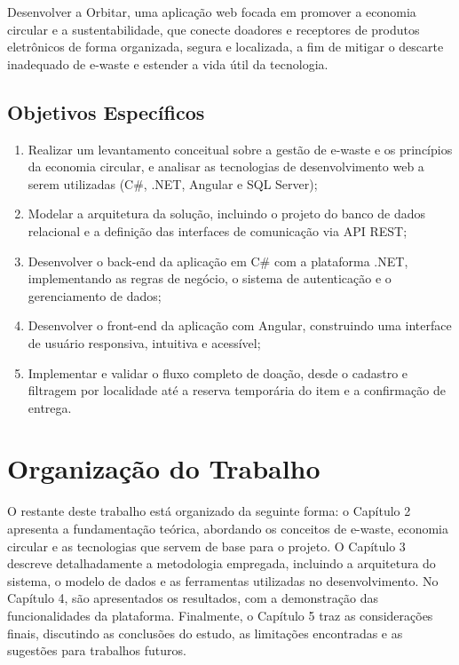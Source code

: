 \documentclass[
	12pt,				%
	openright,			%
	oneside,			%
	a4paper,			%
	english,			%
	brazil				%
	]{abntex2}
\theoremstyle{definition}
\begin{document}
Desenvolver a Orbitar, uma aplicação web focada em promover a economia circular e a sustentabilidade, que conecte doadores e receptores de produtos eletrônicos de forma organizada, segura e localizada, a fim de mitigar o descarte inadequado de e-waste e estender a vida útil da tecnologia.

\subsection[Objetivos Específicos]{Objetivos Específicos}

\begin{enumerate}[label={\alph*}]
    \item Realizar um levantamento conceitual sobre a gestão de e-waste e os princípios da economia circular, e analisar as tecnologias de desenvolvimento web a serem utilizadas (C\#, .NET, Angular e SQL Server);
    \item Modelar a arquitetura da solução, incluindo o projeto do banco de dados relacional e a definição das interfaces de comunicação via API REST;
    \item Desenvolver o back-end da aplicação em C\# com a plataforma .NET, implementando as regras de negócio, o sistema de autenticação e o gerenciamento de dados;
    \item Desenvolver o front-end da aplicação com Angular, construindo uma interface de usuário responsiva, intuitiva e acessível;
    \item Implementar e validar o fluxo completo de doação, desde o cadastro e filtragem por localidade até a reserva temporária do item e a confirmação de entrega.
\end{enumerate}

\section[Organização do Trabalho]{Organização do Trabalho}

O restante deste trabalho está organizado da seguinte forma: o Capítulo 2 apresenta a fundamentação teórica, abordando os conceitos de e-waste, economia circular e as tecnologias que servem de base para o projeto. O Capítulo 3 descreve detalhadamente a metodologia empregada, incluindo a arquitetura do sistema, o modelo de dados e as ferramentas utilizadas no desenvolvimento. No Capítulo 4, são apresentados os resultados, com a demonstração das funcionalidades da plataforma. Finalmente, o Capítulo 5 traz as considerações finais, discutindo as conclusões do estudo, as limitações encontradas e as sugestões para trabalhos futuros.
\end{document}
